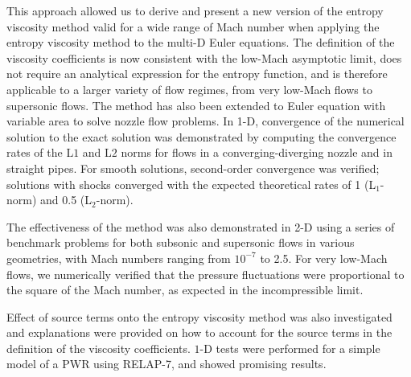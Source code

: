 This approach allowed us to derive and present a new version of the entropy viscosity method valid for a wide range of Mach number when applying the entropy viscosity method to the multi-D Euler equations. The definition of the viscosity coefficients
is now consistent with the low-Mach asymptotic limit, does not require an analytical expression 
for the entropy function, and is therefore applicable to a larger variety of flow regimes, from very 
low-Mach flows to supersonic flows. 
The method has also been extended to Euler equation with variable area to solve nozzle flow problems.
In 1-D, convergence of the numerical solution to 
the exact solution was demonstrated by computing the convergence rates of the L$1$ and L$2$ norms 
for flows in a converging-diverging nozzle and in straight pipes. For smooth solutions, second-order 
convergence was verified; solutions with shocks converged with the expected theoretical rates of 1 (L$_1$-norm)
and 0.5 (L$_2$-norm).

The effectiveness of the method was also demonstrated in 2-D using a series of benchmark problems
for both subsonic and supersonic flows in various geometries, with Mach numbers ranging from $10^{-7}$ to 
2.5. For very low-Mach flows, we numerically verified that the pressure fluctuations were proportional to 
the square of the Mach number, as expected in the incompressible limit.

Effect of source terms onto the entropy viscosity method was also investigated and explanations were provided on how to account for the source terms in the definition of the viscosity coefficients. $1$-D tests were performed for a simple model of a PWR using RELAP-7, and showed promising results.\\

